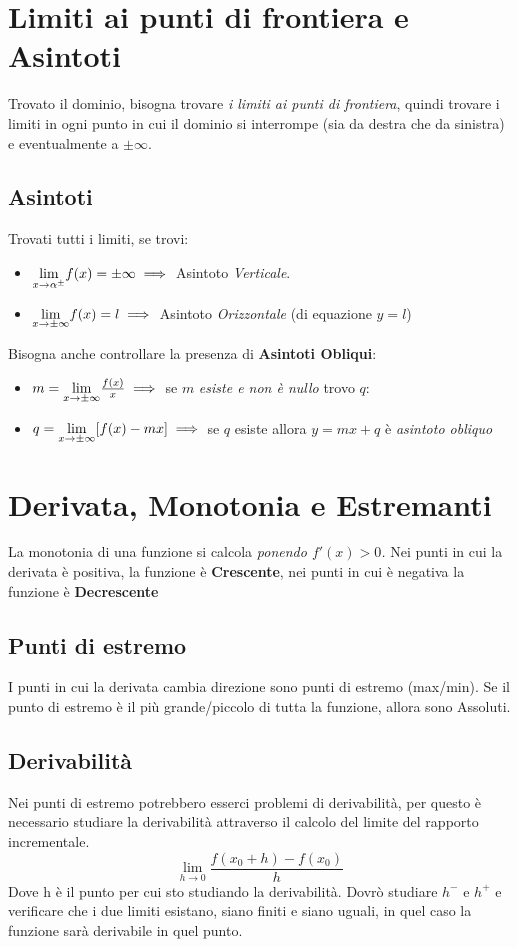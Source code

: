 \documentclass[12pt, a4paper, openany]{book}
\begin{document}
\section{Limiti ai punti di frontiera e Asintoti}
Trovato il dominio, bisogna trovare \emph{i limiti ai punti di frontiera},
quindi trovare i limiti in ogni punto in cui il dominio si interrompe (sia da destra che da sinistra) e eventualmente a $\pm \infty$.

\subsection{Asintoti}
Trovati tutti i limiti, se trovi:
\begin{itemize}
	\item $\underset{x \to \alpha^\pm}{\lim} f(x) = \pm \infty \implies$ Asintoto \emph{Verticale}.
	\item $\underset{x \to \pm \infty}{\lim} f(x) = l \implies$ Asintoto \emph{Orizzontale} (di equazione $y=l$)
\end{itemize}
Bisogna anche controllare la presenza di \textbf{Asintoti Obliqui}:
\begin{itemize}
	\item $m = \underset{x \to \pm \infty}{\lim} \frac{f(x)}{x} \implies$ se $m$ \emph{esiste e non è nullo} trovo $q$:
	\item $q = \underset{x \to \pm \infty}{\lim} [f(x) - mx]\implies$  se $q$ esiste allora $y=mx+q$ è \emph{asintoto obliquo}
\end{itemize}

\section{Derivata, Monotonia e Estremanti}
La monotonia di una funzione si calcola \emph{ponendo $f'(x)>0$.}
Nei punti in cui la derivata è positiva, la funzione è \textbf{Crescente}, nei punti in cui è negativa la funzione è \textbf{Decrescente}
\subsection{Punti di estremo} I punti in cui la derivata cambia direzione sono punti di estremo (max/min).
Se il punto di estremo è il più grande/piccolo di tutta la funzione, allora sono Assoluti.
\subsection{Derivabilità}
Nei punti di estremo potrebbero esserci problemi di derivabilità, per questo è necessario studiare la derivabilità attraverso
il calcolo del limite del rapporto incrementale.
\begin{equation*}
	\lim_{h \rightarrow 0} \frac{f(x_0 + h) - f(x_0)}{h}
\end{equation*}
Dove h è il punto per cui sto studiando la derivabilità. Dovrò studiare $h^-$ e $h^+$ e verificare che i due
limiti esistano, siano finiti e siano uguali, in quel caso la funzione sarà derivabile in quel punto.
\end{document}
